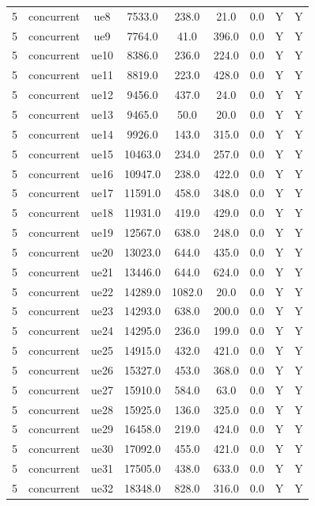 \begin{table}[ht]
\begin{tabular}{|c|c|c|c|c|c|c|c|c|}
5 & concurrent & ue8 & 7533.0 & 238.0 & 21.0 & 0.0 & Y & Y \\
5 & concurrent & ue9 & 7764.0 & 41.0 & 396.0 & 0.0 & Y & Y \\
5 & concurrent & ue10 & 8386.0 & 236.0 & 224.0 & 0.0 & Y & Y \\
5 & concurrent & ue11 & 8819.0 & 223.0 & 428.0 & 0.0 & Y & Y \\
5 & concurrent & ue12 & 9456.0 & 437.0 & 24.0 & 0.0 & Y & Y \\
5 & concurrent & ue13 & 9465.0 & 50.0 & 20.0 & 0.0 & Y & Y \\
5 & concurrent & ue14 & 9926.0 & 143.0 & 315.0 & 0.0 & Y & Y \\
5 & concurrent & ue15 & 10463.0 & 234.0 & 257.0 & 0.0 & Y & Y \\
5 & concurrent & ue16 & 10947.0 & 238.0 & 422.0 & 0.0 & Y & Y \\
5 & concurrent & ue17 & 11591.0 & 458.0 & 348.0 & 0.0 & Y & Y \\
5 & concurrent & ue18 & 11931.0 & 419.0 & 429.0 & 0.0 & Y & Y \\
5 & concurrent & ue19 & 12567.0 & 638.0 & 248.0 & 0.0 & Y & Y \\
5 & concurrent & ue20 & 13023.0 & 644.0 & 435.0 & 0.0 & Y & Y \\
5 & concurrent & ue21 & 13446.0 & 644.0 & 624.0 & 0.0 & Y & Y \\
5 & concurrent & ue22 & 14289.0 & 1082.0 & 20.0 & 0.0 & Y & Y \\
5 & concurrent & ue23 & 14293.0 & 638.0 & 200.0 & 0.0 & Y & Y \\
5 & concurrent & ue24 & 14295.0 & 236.0 & 199.0 & 0.0 & Y & Y \\
5 & concurrent & ue25 & 14915.0 & 432.0 & 421.0 & 0.0 & Y & Y \\
5 & concurrent & ue26 & 15327.0 & 453.0 & 368.0 & 0.0 & Y & Y \\
5 & concurrent & ue27 & 15910.0 & 584.0 & 63.0 & 0.0 & Y & Y \\
5 & concurrent & ue28 & 15925.0 & 136.0 & 325.0 & 0.0 & Y & Y \\
5 & concurrent & ue29 & 16458.0 & 219.0 & 424.0 & 0.0 & Y & Y \\
5 & concurrent & ue30 & 17092.0 & 455.0 & 421.0 & 0.0 & Y & Y \\
5 & concurrent & ue31 & 17505.0 & 438.0 & 633.0 & 0.0 & Y & Y \\
5 & concurrent & ue32 & 18348.0 & 828.0 & 316.0 & 0.0 & Y & Y \\

\end{tabular}
\end{table}
